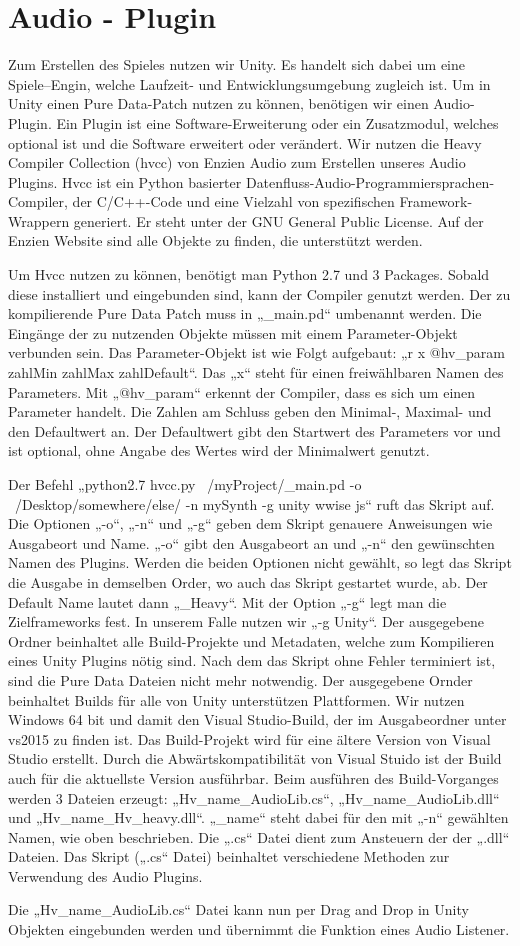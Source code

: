\documentclass[a4paper, 11pt]{scrartcl}
\begin{document}
\section{Audio - Plugin}
\label{sec:Audio - Plugin}

Zum Erstellen des Spieles nutzen wir Unity. Es handelt sich dabei um eine Spiele–Engin, welche Laufzeit- und Entwicklungsumgebung zugleich ist. Um in Unity einen Pure Data-Patch nutzen zu können, benötigen wir einen Audio-Plugin. Ein Plugin ist eine Software-Erweiterung oder ein Zusatzmodul, welches optional ist und die Software erweitert oder verändert. 
Wir nutzen die Heavy Compiler Collection (hvcc) von Enzien Audio zum Erstellen unseres Audio Plugins. 
Hvcc ist ein Python basierter Datenfluss-Audio-Programmiersprachen-Compiler, der C/C++-Code und eine Vielzahl von spezifischen Framework-Wrappern generiert. Er steht unter der GNU General Public License. Auf der Enzien Website sind alle Objekte zu finden, die unterstützt werden. 

Um Hvcc nutzen zu können, benötigt man Python 2.7 und 3 Packages. Sobald diese installiert und eingebunden sind, kann der Compiler genutzt werden. Der zu kompilierende Pure Data Patch muss in „_main.pd“ umbenannt werden. Die Eingänge der zu nutzenden Objekte müssen mit einem Parameter-Objekt verbunden sein. Das Parameter-Objekt ist wie Folgt aufgebaut: „r x @hv_param zahlMin zahlMax zahlDefault“. Das „x“ steht für einen freiwählbaren Namen des Parameters. Mit „@hv_param“ erkennt der Compiler, dass es sich um einen Parameter handelt. Die Zahlen am Schluss geben den Minimal-, Maximal- und den Defaultwert an. Der Defaultwert gibt den Startwert des Parameters vor und ist optional, ohne Angabe des Wertes wird der Minimalwert genutzt. 

Der Befehl „python2.7 hvcc.py ~/myProject/_main.pd -o ~/Desktop/somewhere/else/ -n mySynth -g unity wwise js“ ruft das Skript auf. Die Optionen „-o“, „-n“ und „-g“ geben dem Skript genauere Anweisungen wie Ausgabeort und Name. 
„-o“ gibt den Ausgabeort an und „-n“ den gewünschten Namen des Plugins. Werden die beiden Optionen nicht gewählt, so legt das Skript die Ausgabe in demselben Order, wo auch das Skript gestartet wurde, ab. Der Default Name lautet dann „_Heavy“. Mit der Option „-g“ legt man die Zielframeworks fest. In unserem Falle nutzen wir „-g Unity“. Der ausgegebene Ordner beinhaltet alle Build-Projekte und Metadaten, welche zum Kompilieren eines Unity Plugins nötig sind. Nach dem das Skript ohne Fehler terminiert ist, sind die Pure Data Dateien nicht mehr notwendig. Der ausgegebene Ornder beinhaltet Builds für alle von Unity unterstützen Plattformen. Wir nutzen Windows 64 bit und damit den Visual Studio-Build, der im Ausgabeordner unter vs2015 zu finden ist. Das Build-Projekt wird für eine ältere Version von Visual Studio erstellt. Durch die Abwärtskompatibilität von Visual Stuido ist der Build auch für die aktuellste Version ausführbar.
Beim ausführen des Build-Vorganges werden 3 Dateien erzeugt: „Hv_name_AudioLib.cs“, „Hv_name_AudioLib.dll“ und „Hv_name_Hv_heavy.dll“. „_name“ steht dabei für den mit „-n“ gewählten Namen, wie oben beschrieben.  Die „.cs“ Datei dient zum Ansteuern der der „.dll“ Dateien. Das Skript („.cs“ Datei) beinhaltet verschiedene Methoden zur Verwendung des Audio Plugins. 

Die „Hv_name_AudioLib.cs“ Datei kann nun per Drag and Drop in Unity Objekten eingebunden werden und übernimmt die Funktion eines Audio Listener.
\end{document}
